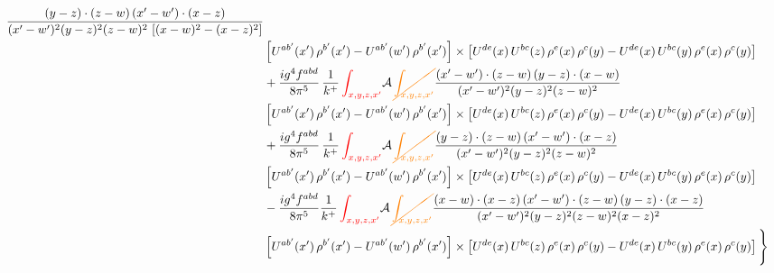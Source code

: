 \documentclass[9pt]{article}
\numberwithin{equation}{section}
\begin{document}
\begin{align}
\frac{(y-z)\cdot(z-w)\,(x'-w')\cdot(x-z)}{(x'-w')^{2}(y-z)^{2}(z-w)^{2}\,\left[(x-w)^{2}-(x-z)^{2}\right]}\notag \\ & \left[U^{ab'}(x')\,\rho^{b'}(x')-U^{ab'}(w')\, \rho^{b'}(x')\right]\times \left[U^{de}(x)\,U^{bc}(z)\, \rho^{e}(x)\,\rho^{c}(y)-U^{de}(x)\,U^{bc}(y)\,\rho^{e}(x)\,\rho^{c}(y)\right]\notag \\ & +\frac{ig^{4}f^{abd}}{8\pi^{5}}\,\frac{1}{k^{+}}\,{\color{red}\int_{x,y,z,x'}}\mathcal{A}\,{\color{orange}\cancel{\int_{x,y,z,x'}}}
\frac{(x'-w')\cdot(z-w)\,(y-z)\cdot(x-w)}{(x'-w')^{2}(y-z)^{2}(z-w)^{2}}\notag \\
& \left[U^{ab'}(x')\,\rho^{b'}(x')-U^{ab'}(w')\, \rho^{b'}(x')\right]\times \left[U^{de}(x)\,U^{bc}(z)\, \rho^{e}(x)\,\rho^{c}(y)-U^{de}(x)\,U^{bc}(y)\,\rho^{e}(x)\,\rho^{c}(y)\right]\notag \\ & +\frac{ig^{4}f^{abd}}{8\pi^{5}}\,\frac{1}{k^{+}}\,{\color{red}\int_{x,y,z,x'}}\mathcal{A}\,{\color{orange}\cancel{\int_{x,y,z,x'}}}
\frac{(y-z)\cdot(z-w)\,(x'-w')\cdot(x-z)}{(x'-w')^{2}(y-z)^{2}(z-w)^{2}}\notag \\ & \left[U^{ab'}(x')\,\rho^{b'}(x')-U^{ab'}(w')\, \rho^{b'}(x')\right]\times \left[U^{de}(x)\,U^{bc}(z)\, \rho^{e}(x)\,\rho^{c}(y)-U^{de}(x)\,U^{bc}(y)\,\rho^{e}(x)\,\rho^{c}(y)\right]\notag \\ & -\frac{ig^{4}f^{abd}}{8\pi^{5}}\frac{1}{k^{+}}\,{\color{red}\int_{x,y,z,x'}}\mathcal{A}\,{\color{orange}\cancel{\int_{x,y,z,x'}}}
\frac{(x-w)\cdot(x-z)\,(x'-w')\cdot(z-w)\,(y-z)\cdot(x-z)}{(x'-w')^{2}(y-z)^{2}(z-w)^{2}(x-z)^{2}}\notag \\ & \left[U^{ab'}(x')\,\rho^{b'}(x')-U^{ab'}(w')\, \rho^{b'}(x')\right]\times \left[U^{de}(x)\,U^{bc}(z)\, \rho^{e}(x)\,\rho^{c}(y)-U^{de}(x)\,U^{bc}(y)\,\rho^{e}(x)\,\rho^{c}(y)\right]\Bigg\}
\end{align}
\end{document}
